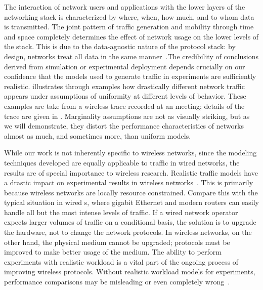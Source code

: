 \documentclass[twocolumn,final]{svjour3}
\begin{document}
The interaction of network users and applications with the lower layers of the networking stack is characterized by where, when, how much, and to whom data is transmitted. The joint pattern of traffic generation and mobility through time and space completely determines the effect of network usage on the lower levels of the stack. This is due to the data-agnostic nature of the protocol stack: by design,  networks treat all data in the same manner~\cite{Clark88}.\QoSnote The credibility of conclusions derived from simulation or experimental deployment depends crucially on our confidence that the models used to generate traffic in experiments are sufficiently realistic.  illustrates through examples how drastically different network traffic appears under assumptions of uniformity at different levels of behavior. These examples are take from a wireless trace recorded at an  meeting; details of the trace are given in . Marginality assumptions are not as visually striking, but as we will demonstrate, they distort the performance characteristics of networks almost as much, and sometimes more, than uniform models.

While our work is not inherently specific to wireless networks, since the modeling techniques developed are equally applicable to traffic in wired networks, the results are of special importance to wireless research.
Realistic traffic models have a drastic impact on experimental results in wireless networks~\cite{Karpinski07:realism,Karpinski07:cbr-failure}.
This is primarily because wireless networks are locally resource constrained.
Compare this with the typical situation in wired s, where gigabit Ethernet and modern routers  can easily handle all but the most intense levels of traffic.
If a wired network operator expects larger volumes of traffic on a conditional basis, the solution is to upgrade the hardware, not to change the network protocols.
In wireless networks, on the other hand, the physical medium cannot be upgraded; protocols must be improved to make better usage of the medium.
The ability to perform experiments with realistic workload is a vital part of the ongoing process of improving wireless protocols.
Without realistic workload models for experiments, performance comparisons may be misleading or even completely wrong~\cite{Karpinski07:cbr-failure}.
\end{document}
